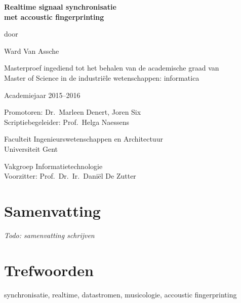 
\newpage

{
\setlength{\baselineskip}{14pt}
\setlength{\parindent}{0pt}
\setlength{\parskip}{8pt}

\begin{center}

\noindent \textbf{\huge
Realtime signaal synchronisatie\\[8pt]
met accoustic fingerprinting
}

door 

Ward Van Assche

Masterproef ingediend tot het behalen van de academische graad van\\
Master of Science in de industriële wetenschappen: informatica

Academiejaar 2015--2016

Promotoren: Dr.~Marleen Denert, Joren Six\\
Scriptiebegeleider: Prof.~Helga Naessens

Faculteit Ingenieurswetenschappen en Architectuur\\
Universiteit Gent

Vakgroep Informatietechnologie\\
Voorzitter: Prof.~Dr.~Ir.~Dani\"{e}l De Zutter


\end{center}

\section*{Samenvatting}


\textit{Todo: samenvatting schrijven}




\section*{Trefwoorden}


synchronisatie, realtime, datastromen, musicologie, accoustic fingerprinting

}

\newpage %
